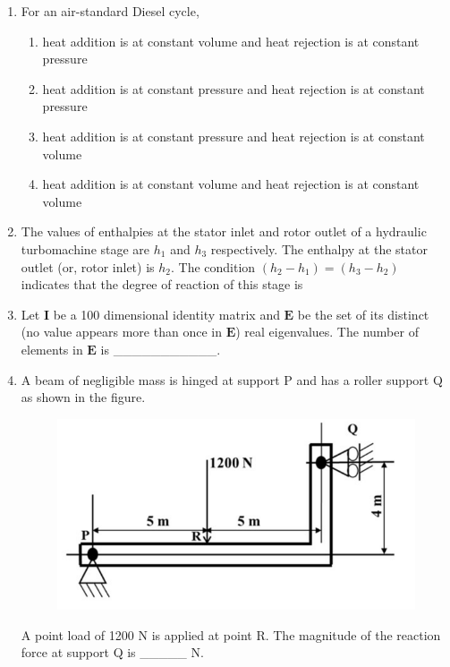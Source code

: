 \documentclass[12pt,onecolumn]{article}
\begin{document}
\begin{enumerate}
    \item For an air-standard Diesel cycle,
          \begin{enumerate}
              \item heat addition is at constant volume and heat rejection is at constant pressure
              \item heat addition is at constant pressure and heat rejection is at constant pressure
              \item heat addition is at constant pressure and heat rejection is at constant volume
              \item heat addition is at constant volume and heat rejection is at constant volume
          \end{enumerate}

    \item The values of enthalpies at the stator inlet and rotor outlet of a hydraulic turbomachine stage are $h_1$ and $h_3$ respectively. The enthalpy at the stator outlet (or, rotor inlet) is $h_2$. The condition $(h_2 - h_1) = (h_3 - h_2)$ indicates that the degree of reaction of this stage is
          \begin{enumerate}
          \end{enumerate}

    \item Let $\mathbf{I}$ be a 100 dimensional identity matrix and $\mathbf{E}$ be the set of its distinct (no value appears more than once in $\mathbf{E}$) real eigenvalues. The number of elements in $\mathbf{E}$ is \_\_\_\_\_\_\_\_\_\_\_.

    \item A beam of negligible mass is hinged at support P and has a roller support Q as shown in the figure.
          \begin{figure}[H]
              \centering
              \includegraphics[scale=0.5]{q20s2}
              \label{fig:q20s2}
          \end{figure}
          A point load of 1200 N is applied at point R. The magnitude of the reaction force at support Q is \_\_\_\_\_ N.


\end{enumerate}
\end{document}
